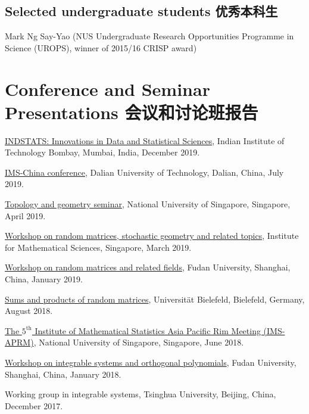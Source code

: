 \documentclass[12pt,a4paper]{article}
\newenvironment{item_list}{
 \begin{list}{}{
   \setlength{\leftmargin}{1.5em}
   \setlength{\itemsep}{0.25em}
   \setlength{\parskip}{0pt}
   \setlength{\parsep}{0.25em}
 }
}{
 \end{list}
}
\begin{document}
\subsection*{Selected undergraduate students 优秀本科生}

Mark Ng Say-Yao (NUS Undergraduate Research Opportunities Programme in Science (UROPS), winner of 2015/16 CRISP award)

\section*{Conference and Seminar Presentations 会议和讨论班报告}

\begin{item_list}
\item
  \href{https://www.intindstat.org/iisaconference2019/}{INDSTATS: Innovations in Data and Statistical Sciences}, Indian Institute of Technology Bombay, Mumbai, India, December 2019.
\item
  \href{http://www.ims-china.org/}{IMS-China conference}, Dalian University of Technology, Dalian, China, July 2019.
\item
  \href{http://www.math.nus.edu.sg/seminars.aspx?CatID=5}{Topology and geometry seminar}, National University of Singapore, Singapore, April 2019.
\item
  \href{https://sites.google.com/view/randommatrices2019nus}{Workshop on random matrices, stochastic geometry and related topics}, Institute for Mathematical Sciences, Singapore, March 2019.
\item
  \href{http://math.fudan.edu.cn/show.aspx?info_lb=766&flag=527&info_id=6117}{Workshop on random matrices and related fields}, Fudan University, Shanghai, China, January 2019.
\item
  \href{https://www.uni-bielefeld.de/(en)/ZiF/AG/2018/08-27-Akemann.html}{Sums and products of random matrices}, Universit\"{a}t Bielefeld, Bielefeld, Germany, August 2018.
\item
  \href{https://ims-aprm2018.stat.nus.edu.sg/}{The $5^{\text{th}}$ Institute of Mathematical Statistics Asia Pacific Rim Meeting (IMS-APRM)}, National University of Singapore, Singapore, June 2018.
\item
  \href{http://math.fudan.edu.cn/en/Data/View/-99994362}{Workshop on integrable systems and orthogonal polynomials}, Fudan University, Shanghai, China, January 2018.
\item
  Working group in integrable systems, Tsinghua University, Beijing, China, December 2017.
\item

\end{item_list}
\end{document}
